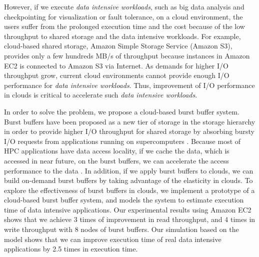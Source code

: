 However, if we execute \emph{data intensive workloads}, such as big data
analysis and checkpointing for visualization or fault tolerance, on a cloud environment, the
users suffer from the prolonged execution time and the cost because of the low
throughput to shared storage and the data intensive workloads.
For example, cloud-based shared storage, Amazon Simple Storage Service (Amazon
S3), provides only a few hundreds MB/s of throughput because instances
in Amazon EC2 is connected to Amazon S3 via Internet.
As demands for higher I/O throughput grow, 
current cloud environments cannot provide enough I/O performance for 
\emph{data intensive workloads}.
Thus, improvement of I/O performance in clouds is critical to accelerate such
\emph{data intensive workloads}.
\par
In order to solve the problem, we propose a cloud-based burst buffer system.
Burst buffers have been proposed as a new tier of storage in the storage
hierarchy in order to provide higher I/O throughput for shared storage by
absorbing bursty I/O requests from applications running on supercomputers
\cite{on_the_role_of_burst_buffers}.
Because most of HPC applications have data access
locality, if we cache the data, which is accessed in near future, on the burst
buffers, we can accelerate the access performance to the data
\cite{montage,povray}.
In addition, if we apply burst buffers to clouds, we can build on-demand burst
buffers by taking advantage of the elasticity in clouds. 
To explore the effectiveness of burst buffers in clouds, 
we implement a prototype of a cloud-based burst buffer system, and models the
system to estimate execution time of data intensive applications.
Our experimental results using Amazon EC2 shows that we achieve 3 times of
improvement in read throughput, and 4 times in write throughput with 8 nodes of
burst buffers. Our simulation based on the model shows that we can
improve execution time of real data intensive applications by 2.5 times in
execution time.
\par



